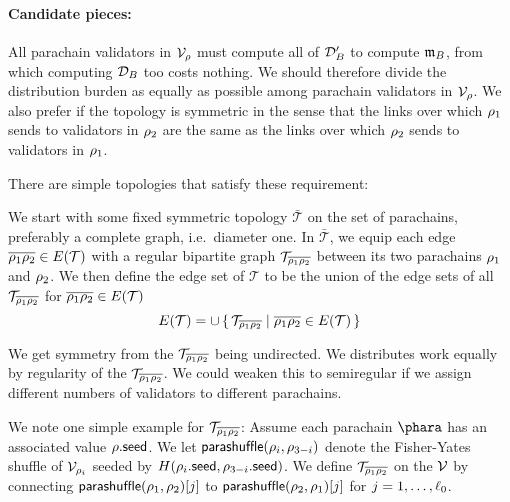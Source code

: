 \smallskip
\paragraph{Candidate pieces:}

All parachain validators in $\mathcal{V}_{\rho}$ must compute all of $\mathcal{D}'_B$ to compute $\mathfrak{m}_B$, from which computing $\mathcal{D}_B$ too costs nothing.  We should therefore divide the distribution burden as equally as possible among parachain validators in $\mathcal{V}_{\rho}$.  We also prefer if the topology is symmetric in the sense that the links over which $\rho_1$ sends to validators in $\rho_2$ are the same as the links over which $\rho_2$ sends to validators in $\rho_1$.  


There are simple topologies that satisfy these requirement:

We start with some fixed symmetric topology $\bar{\mathcal{T}}$ on the set of parachains, preferably a complete graph, i.e.\ diameter one.  In $\bar{\mathcal{T}}$, we equip each edge $\overline{\rho_1 \rho_2} \in E(\mathcal{T})$ with a regular bipartite graph $\mathcal{T}_{\overline{\rho_1 \rho_2}}$ between its two parachains $\rho_1$ and $\rho_2$.  We then define the edge set of $\mathcal{T}$ to be the union of the edge sets of all $\mathcal{T}_{\overline{\rho_1 \rho_2}}$ for $\overline{\rho_1 \rho_2} \in E(\mathcal{T})$
$$ E(\mathcal{T}) = \cup \Setst{ \mathcal{T}_{\overline{\para_1 \para_2}} }{ \overline{\para_1 \para_2} \in E(\mathcal{T}) } $$

We get symmetry from the $\mathcal{T}_{\overline{\rho_1 \rho_2}}$ being undirected.  We distributes work equally by regularity of the $\mathcal{T}_{\overline{\rho_1 \rho_2}}$.  We could weaken this to semiregular if we assign different numbers of validators to different parachains.

We note one simple example for $\mathcal{T}_{\overline{\rho_1 \rho_2}}$:  
Assume each parachain $\phara$ has an associated value $\rho.\mathsf{seed}$.  We let $\mathsf{parashuffle}(\rho_i,\rho_{3-i})$ denote the Fisher-Yates shuffle of $\mathcal{V}_{\rho_i}$ seeded by $H( \rho_i.\mathsf{seed}, \rho_{3-i}.\mathsf{seed} )$.  We define $\mathcal{T}_{\overline{\rho_1 \rho_2}}$ on the $\mathcal{V}$ by connecting $\mathsf{parashuffle}(\rho_1,\rho_2)[j]$ to $\mathsf{parashuffle}(\rho_2,\rho_1)[j]$ for $j = 1,\ldots,\ell_0$.



